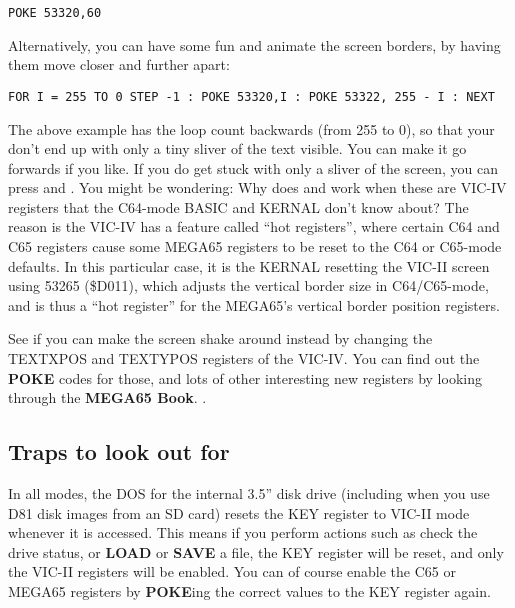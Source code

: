 \begin{tcolorbox}[colback=black,coltext=white]
\verbatimfont{\codefont}
\begin{verbatim}
POKE 53320,60
\end{verbatim}
\end{tcolorbox}

Alternatively, you can have some fun and animate the screen borders, by having them move closer and further apart:

\begin{tcolorbox}[colback=black,coltext=white]
\verbatimfont{\codefont}
\begin{verbatim}
FOR I = 255 TO 0 STEP -1 : POKE 53320,I : POKE 53322, 255 - I : NEXT
\end{verbatim}
\end{tcolorbox}

The above example has the loop count backwards (from 255 to 0), so that your don't end up with only a
tiny sliver of the text visible. You can make it go forwards if you like. If you do get stuck with only a sliver
of the screen, you can press  and . You might be wondering: Why does 
and  work when these are VIC-IV registers that the C64-mode BASIC and KERNAL
don't know about?  The reason is the VIC-IV has a feature called ``hot registers'',
where certain C64 and C65 registers cause some MEGA65 registers to be reset to the C64 or
C65-mode defaults. In this particular case, it is the KERNAL resetting the VIC-II screen using
53265 (\$D011), which adjusts the vertical border size in C64/C65-mode, and is thus a ``hot register''
for the MEGA65's vertical border position registers.

See if you can make the screen shake around instead by changing the TEXTXPOS and TEXTYPOS registers of
the VIC-IV.  You can find out the {\bf POKE} codes for those, and lots of other interesting new registers
by looking through
\ifdefined\printmanual
 the {\bf MEGA65 Book}.
\else
 .
\fi


\subsection{Traps to look out for}

In all modes, the DOS for the internal 3.5'' disk drive (including when you use D81 disk images from
an SD card) resets the KEY register to VIC-II mode whenever it is accessed. This means if you perform actions
such as check the drive status, or {\bf LOAD} or {\bf SAVE} a file, the KEY register will be reset, and only the VIC-II registers
will be enabled. You can of course enable the C65 or MEGA65 registers by {\bf POKE}ing the correct values
to the KEY register again.

